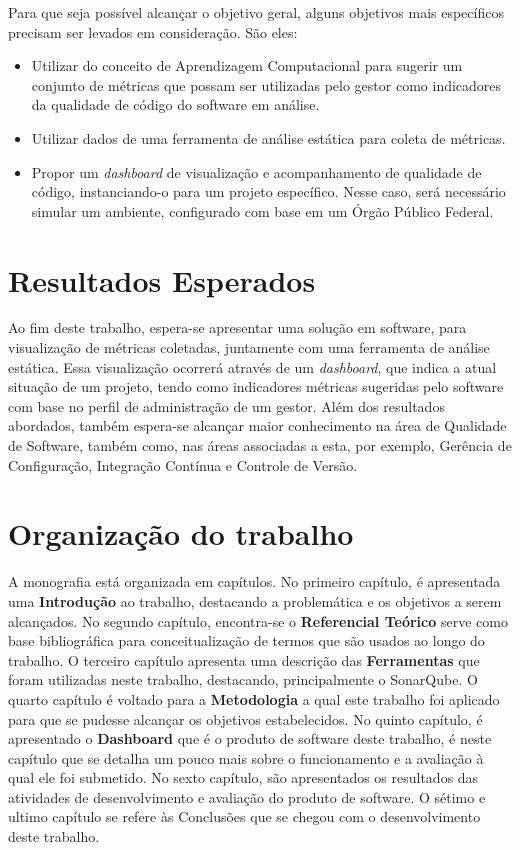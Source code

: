 	Para que seja possível alcançar o objetivo geral, alguns objetivos mais específicos precisam ser levados em consideração. São eles:
		
	\begin{itemize}
		\item Utilizar do conceito de Aprendizagem Computacional para sugerir um conjunto de métricas que possam ser utilizadas pelo gestor como indicadores da qualidade de código do software em análise.
		\item Utilizar dados de uma ferramenta de análise estática para coleta de métricas. 
		\item Propor um \textit{dashboard} de visualização e acompanhamento de qualidade de código, instanciando-o para um projeto específico. Nesse caso, será necessário simular um ambiente, configurado com base em um Órgão Público Federal.
		
	\end{itemize}
	
	
	\section{Resultados Esperados}

Ao fim deste trabalho, espera-se apresentar uma solução em software, para visualização de métricas coletadas,  juntamente com uma ferramenta de análise estática. Essa visualização ocorrerá através de um \textit{dashboard}, que indica a atual situação de um projeto, tendo como indicadores métricas sugeridas pelo software com base no perfil de administração de um gestor.
Além dos resultados abordados, também espera-se alcançar maior conhecimento na área de Qualidade de Software, também como, nas áreas associadas a esta, por exemplo, Gerência de Configuração, Integração Contínua e Controle de Versão.

	\section{Organização do trabalho} %
	\label{sec:organização_do_trabalho} 	
A monografia está organizada em capítulos. No primeiro capítulo, é apresentada uma \textbf{Introdução} ao trabalho, destacando a problemática e os objetivos a serem alcançados. No segundo capítulo, encontra-se o \textbf{Referencial Teórico} serve como base bibliográfica para conceitualização de termos que são usados ao longo do trabalho. O terceiro capítulo apresenta uma descrição das \textbf{Ferramentas} que foram utilizadas neste trabalho, destacando, principalmente o SonarQube. O quarto capítulo é voltado para a \textbf{Metodologia} a qual este trabalho foi aplicado para que se pudesse alcançar os objetivos estabelecidos. No quinto capítulo, é apresentado o \textbf{Dashboard} que é o produto de software deste trabalho, é neste capítulo que se detalha um pouco mais sobre o funcionamento e a avaliação à qual ele foi submetido. No sexto capítulo, são apresentados os resultados das atividades de desenvolvimento e avaliação do produto de software. O sétimo e ultimo capítulo se refere às Conclusões que se chegou com o desenvolvimento deste trabalho.